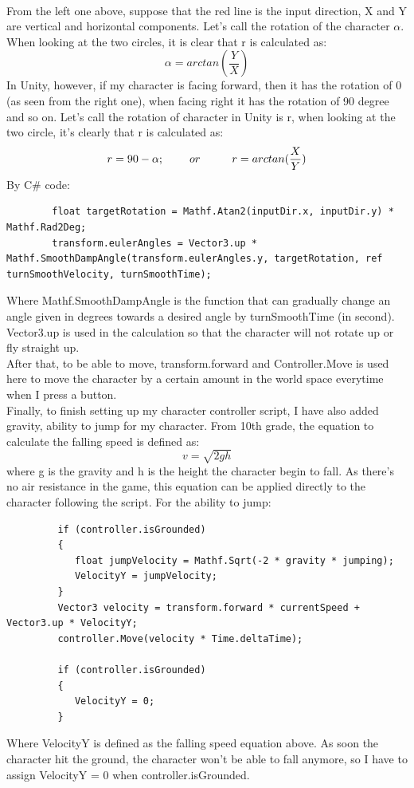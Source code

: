 \documentclass[a4paper, 13pt]{extarticle}
\begin{document}
 	 	\\[0.02cm]
 	 	From the left one above, suppose that the red line is the input direction, X and Y are vertical and horizontal components. Let's call the rotation of the character  {$\alpha$}. When looking at the two circles, it is clear that r is calculated as: 
 	 	\\[-0.5cm]
 	 	\[\alpha = arctan(\frac{Y}{X})\]
 	 	In Unity, however, if my character is facing forward, then it has the rotation of 0 (as seen from the right one), when facing right it has the rotation of 90 degree and so on. Let's call the rotation of character in Unity is r, when looking at the two circle, it's clearly that r is calculated as: \\[-0.5cm]
 	 	 \[r = 90 - \alpha; \hspace{0.8cm} or \hspace{1.0cm} r = arctan(\frac{X}{Y})\] 
 	 	By C\# code:
 	 	\begin{lstlisting}
 	 	float targetRotation = Mathf.Atan2(inputDir.x, inputDir.y) * Mathf.Rad2Deg;
 	 	transform.eulerAngles = Vector3.up * Mathf.SmoothDampAngle(transform.eulerAngles.y, targetRotation, ref turnSmoothVelocity, turnSmoothTime);
 	 	\end{lstlisting}
 	 	
 	 	Where Mathf.SmoothDampAngle is the function that can gradually change an angle given in degrees towards a desired angle by turnSmoothTime (in second). Vector3.up is used in the calculation so that the character will not rotate up or fly straight up.  \\[0.15cm] After that, to be able to move, transform.forward and Controller.Move is used here to move the character by a certain amount in the world space everytime when I press a button. \\[0.15cm] Finally, to finish setting up my character controller script, I have also added gravity, ability to jump for my character. From 10th grade, the equation to calculate the falling speed is defined as: 
 	 	\\[-0.5cm]
 	 	 \[v = \sqrt{2gh}\]
 	 	 where g is the gravity and h is the height the character begin to fall. As there's no air resistance in the game, this equation can be applied directly to the character following the script. For the ability to jump:
 	 	 \begin{lstlisting}
 	 	 if (controller.isGrounded)
 	 	 {
 	 	 	float jumpVelocity = Mathf.Sqrt(-2 * gravity * jumping);
 	 	 	VelocityY = jumpVelocity;
 	 	 }
 	 	 Vector3 velocity = transform.forward * currentSpeed + Vector3.up * VelocityY;
 	 	 controller.Move(velocity * Time.deltaTime);
 	 	 
 	 	 if (controller.isGrounded)
 	 	 {
 	 	 	VelocityY = 0;  
 	 	 }
 	 	 \end{lstlisting}
 	 	 Where VelocityY is defined as the falling speed equation above. As soon the character hit the ground, the character won't be able to fall anymore, so I have to assign VelocityY = 0 when controller.isGrounded. 
\end{document}
